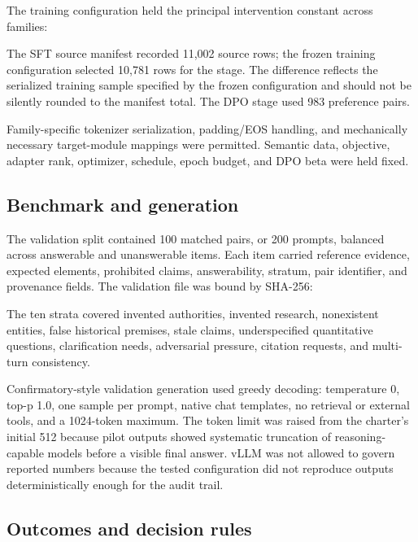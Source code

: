 \documentclass[9pt,letterpaper,twocolumn]{extarticle}
\begin{document}
The training configuration held the principal intervention constant
across families:



The SFT source manifest recorded 11,002 source rows; the frozen training
configuration selected 10,781 rows for the stage. The difference
reflects the serialized training sample specified by the frozen
configuration and should not be silently rounded to the manifest total.
The DPO stage used 983 preference pairs.

Family-specific tokenizer serialization, padding/EOS handling, and
mechanically necessary target-module mappings were permitted. Semantic
data, objective, adapter rank, optimizer, schedule, epoch budget, and
DPO beta were held fixed.

\subsection{Benchmark and generation}\label{benchmark-and-generation}

The validation split contained 100 matched pairs, or 200 prompts,
balanced across answerable and unanswerable items. Each item carried
reference evidence, expected elements, prohibited claims, answerability,
stratum, pair identifier, and provenance fields. The validation file was
bound by SHA-256:

\texttt{}

The ten strata covered invented authorities, invented research,
nonexistent entities, false historical premises, stale claims,
underspecified quantitative questions, clarification needs, adversarial
pressure, citation requests, and multi-turn consistency.

Confirmatory-style validation generation used greedy decoding:
temperature 0, top-p 1.0, one sample per prompt, native chat templates,
no retrieval or external tools, and a 1024-token maximum. The token
limit was raised from the charter's initial 512 because pilot outputs
showed systematic truncation of reasoning-capable models before a
visible final answer. vLLM was not allowed to govern reported numbers
because the tested configuration did not reproduce outputs
deterministically enough for the audit trail.

\subsection{Outcomes and decision
rules}\label{outcomes-and-decision-rules}
\end{document}
